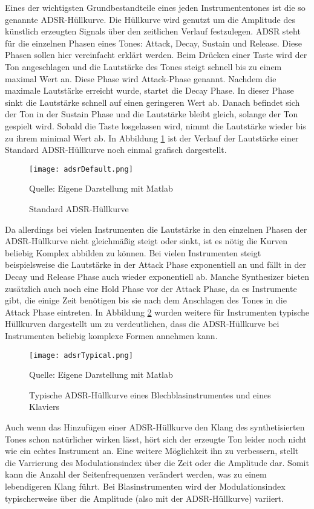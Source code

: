 Eines der wichtigsten Grundbestandteile eines jeden Instrumententones ist die so genannte ADSR-Hüllkurve. Die Hüllkurve wird genutzt um die Amplitude des künstlich erzeugten Signals über den zeitlichen Verlauf festzulegen. ADSR steht für die einzelnen Phasen eines Tones: Attack, Decay, Sustain und Release. Diese Phasen sollen hier vereinfacht erklärt werden. Beim Drücken einer Taste wird der Ton angeschlagen und die Lautstärke des Tones steigt schnell bis zu einem maximal Wert an. Diese Phase wird Attack-Phase genannt. Nachdem die maximale Lautstärke erreicht wurde, startet die Decay Phase. In dieser Phase sinkt die Lautstärke schnell auf einen geringeren Wert ab. Danach befindet sich der Ton in der Sustain Phase und die Lautstärke bleibt gleich, solange der Ton gespielt wird. Sobald die Taste losgelassen wird, nimmt die Lautstärke wieder bis zu ihrem minimal Wert ab. In Abbildung \ref{fig:adsrDefault} ist der Verlauf der Lautstärke einer Standard ADSR-Hüllkurve noch einmal grafisch dargestellt.

\begin{figure} [ht]
\centering
  \texttt{[image: adsrDefault.png]}
\caption{Standard ADSR-Hüllkurve}
\label{fig:adsrDefault}
Quelle: Eigene Darstellung mit Matlab
\end{figure}

Da allerdings bei vielen Instrumenten die Lautstärke in den einzelnen Phasen der ADSR-Hüllkurve nicht gleichmäßig steigt oder sinkt, ist es nötig die Kurven beliebig Komplex abbilden zu können. Bei vielen Instrumenten steigt beispielsweise die Lautstärke in der Attack Phase exponentiell an und fällt in der Decay und Release Phase auch wieder exponentiell ab. Manche Synthesizer bieten zusätzlich auch noch eine Hold Phase vor der Attack Phase, da es Instrumente gibt, die einige Zeit benötigen bis sie nach dem Anschlagen des Tones in die Attack Phase eintreten. In Abbildung \ref{fig:adsrTypical} wurden weitere für Instrumenten typische Hüllkurven dargestellt um zu verdeutlichen, dass die ADSR-Hüllkurve bei Instrumenten beliebig komplexe Formen annehmen kann.

\begin{figure} [ht]
\centering
  \texttt{[image: adsrTypical.png]}
\caption{Typische ADSR-Hüllkurve eines Blechblasinstrumentes und eines Klaviers}
\label{fig:adsrTypical}
Quelle: Eigene Darstellung mit Matlab
\end{figure}

Auch wenn das Hinzufügen einer ADSR-Hüllkurve den Klang des synthetisierten Tones schon natürlicher wirken lässt, hört sich der erzeugte Ton leider noch nicht wie ein echtes Instrument an. Eine weitere Möglichkeit ihn zu verbessern, stellt die Varrierung des Modulationsindex über die Zeit oder die Amplitude dar. Somit kann die Anzahl der Seitenfrequenzen verändert werden, was zu einem lebendigeren Klang führt. Bei Blasinstrumenten wird der Modulationsindex typischerweise über die Amplitude (also mit der ADSR-Hüllkurve) variiert. \cite[S. 532]{chowningPaper}

